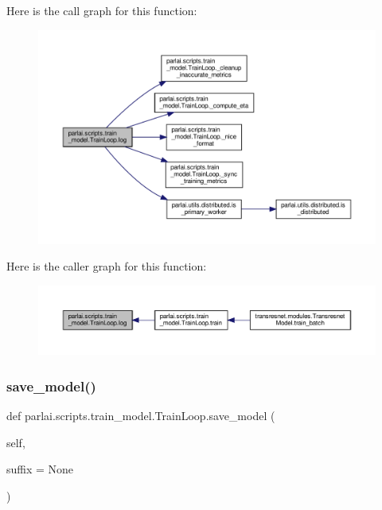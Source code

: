 Here is the call graph for this function\+:
\nopagebreak
\begin{figure}[H]
\begin{center}
\leavevmode
\includegraphics[width=350pt]{classparlai_1_1scripts_1_1train__model_1_1TrainLoop_a8ef64c11f101d087ceb83d21621b9665_cgraph}
\end{center}
\end{figure}
Here is the caller graph for this function\+:
\nopagebreak
\begin{figure}[H]
\begin{center}
\leavevmode
\includegraphics[width=350pt]{classparlai_1_1scripts_1_1train__model_1_1TrainLoop_a8ef64c11f101d087ceb83d21621b9665_icgraph}
\end{center}
\end{figure}
\mbox{\label{classparlai_1_1scripts_1_1train__model_1_1TrainLoop_a352f759a644e87251c37931bf276309a}} 
\subsubsection{\texorpdfstring{save\+\_\+model()}{save\_model()}}
{\footnotesize\ttfamily def parlai.\+scripts.\+train\+\_\+model.\+Train\+Loop.\+save\+\_\+model (\begin{DoxyParamCaption}\item[{}]{self,  }\item[{}]{suffix = {\ttfamily None} }\end{DoxyParamCaption})}

